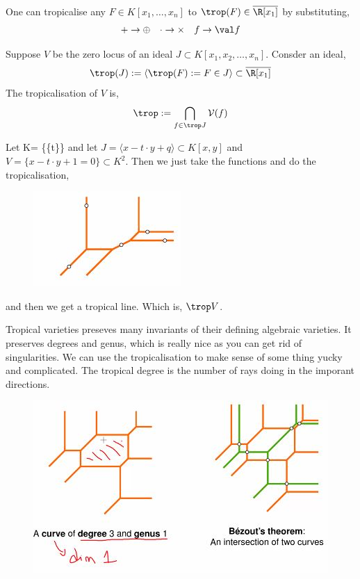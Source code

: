 \documentclass{article}
\begin{document}
\noindent
One can tropicalise any $F \in K[x_1, \dots, x_n]$ to $\trop(F) \in \overline\R [x_1] $ by substituting,
$$ + \to \oplus \quad \cdot \to \times \quad f \to \val f $$

\noindent
Suppose $V$ be the zero locus of an ideal $J \subset K[x_1, x_2, \dots, x_n]$. Consder an ideal,
$$ \trop(J) := \langle \trop(F) := F \in J \rangle \subset \overline\R[x_1] $$
The tropicalisation of $V$ is,
$$ \trop := \bigcap_{f \in \trop J} \mathcal{V}(f) $$

\begin{eg}
  Let K= \{\{t\}\} and let $J = \langle x - t \cdot y + q\rangle \subset K[x, y]$ and $V = \{x - t \cdot y + 1 = 0\} \subset K^2$.
  Then we just take the functions and do the tropicalisation,
  \begin{figure}[!ht]
  \centering
  \includegraphics{./figures/L2.7}
  \end{figure}
  and then we get a tropical line. Which is, $\trop V$.
\end{eg}

\newpage
Tropical varieties preseves many invariants of their defining algebraic varieties. It preserves degrees and genus, which is really nice as you can get rid of singularities. We can use the tropicalisation to make sense of some thing yucky and complicated. The tropical degree is the number of rays doing in the imporant directions.\\

\begin{figure}[!ht]
\centering
\includegraphics{./figures/L2.9}
\end{figure}
\end{document}
